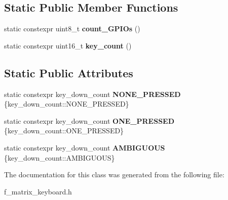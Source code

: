 \subsection*{Static Public Member Functions}
\begin{DoxyCompactItemize}
\item 
\mbox{\label{classfsl_1_1ui_1_1matrix__keyboard_a26550a0b7b68f9597459d381e88a42b9}} 
static constexpr uint8\+\_\+t {\bfseries count\+\_\+\+G\+P\+I\+Os} ()
\item 
\mbox{\label{classfsl_1_1ui_1_1matrix__keyboard_a263a51e28af4c495f97ff9e96da001f8}} 
static constexpr uint16\+\_\+t {\bfseries key\+\_\+count} ()
\end{DoxyCompactItemize}
\subsection*{Static Public Attributes}
\begin{DoxyCompactItemize}
\item 
\mbox{\label{classfsl_1_1ui_1_1matrix__keyboard_a5b8afa2a683ce8b50bb73513267cee73}} 
static constexpr key\+\_\+down\+\_\+count {\bfseries N\+O\+N\+E\+\_\+\+P\+R\+E\+S\+S\+ED} \{key\+\_\+down\+\_\+count\+::\+N\+O\+N\+E\+\_\+\+P\+R\+E\+S\+S\+ED\}
\item 
\mbox{\label{classfsl_1_1ui_1_1matrix__keyboard_af95d76f6283eaf46856626939ad05bf7}} 
static constexpr key\+\_\+down\+\_\+count {\bfseries O\+N\+E\+\_\+\+P\+R\+E\+S\+S\+ED} \{key\+\_\+down\+\_\+count\+::\+O\+N\+E\+\_\+\+P\+R\+E\+S\+S\+ED\}
\item 
\mbox{\label{classfsl_1_1ui_1_1matrix__keyboard_a9c2d4d3485ee7fa685a8b9f5595c05ae}} 
static constexpr key\+\_\+down\+\_\+count {\bfseries A\+M\+B\+I\+G\+U\+O\+US} \{key\+\_\+down\+\_\+count\+::\+A\+M\+B\+I\+G\+U\+O\+US\}
\end{DoxyCompactItemize}


The documentation for this class was generated from the following file\+:\begin{DoxyCompactItemize}
\item 
f\+\_\+matrix\+\_\+keyboard.\+h\end{DoxyCompactItemize}
